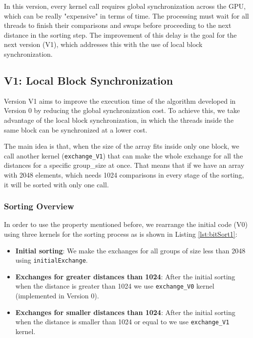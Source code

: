 \documentclass[a4paper,12pt]{article}
\begin{document}
In this version, every kernel call requires global synchronization across the GPU, which can be really "expensive" in terms of time. The processing must wait for all threads to finish their comparisons and swaps before proceeding to the next distance in the sorting step. The improvement of this delay is the goal for the next version (V1), which addresses this with the use of local block synchronization.

\subsection{V1: Local Block Synchronization}

Version V1 aims to improve the execution time of the algorithm developed in Version 0 by reducing the global synchronization cost. To achieve this, we take advantage of the local block synchronization, in which the threads inside the same block can be synchronized at a lower cost. 

The main idea is that, when the size of the array fits inside only one block, we call another kernel (\texttt{exchange\_V1}) that can make the whole exchange for all the distances for a specific group\_size at once. That means that if we have an array with 2048 elements, which needs 1024 comparisons in every stage of the sorting, it will be sorted with only one call.

\subsubsection*{Sorting Overview}
In order to use the property mentioned before, we rearrange the initial code (V0) using three kernels for the sorting process as is shown in Listing \ref{lst:bitSort1}:

\begin{itemize}
    \item \textbf{Initial sorting}: We make the exchanges for all groups of size less than 2048 using \texttt{initialExchange}. 
    \item \textbf{Exchanges for greater distances than 1024}: After the initial sorting when the distance is greater than 1024 we use \texttt{exchange\_V0} kernel (implemented in Version 0).
    \item \textbf{Exchanges for smaller distances than 1024}:
    After the initial sorting when the distance is smaller than 1024 or equal to we use \texttt{exchange\_V1} kernel.
    
\end{itemize}
\end{document}
